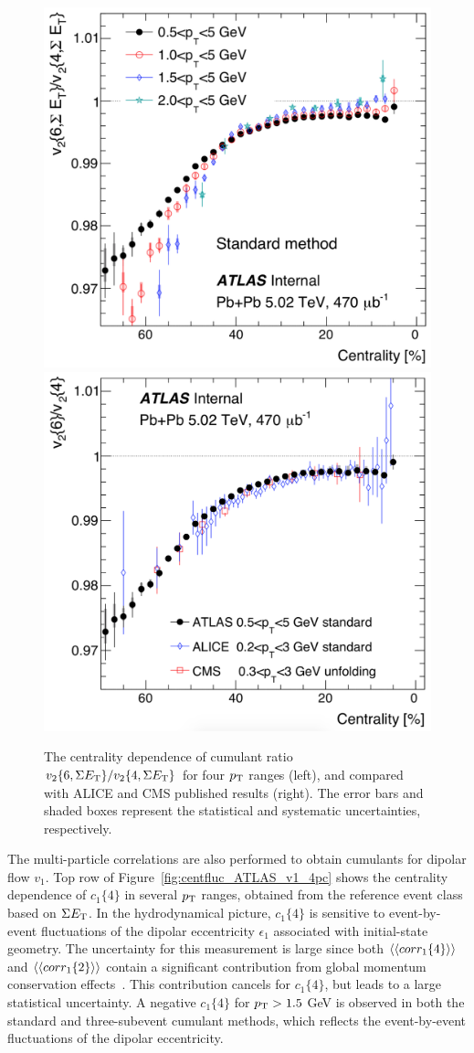 \begin{figure}[H]
\centering
\includegraphics[width=.475\linewidth]{figs/chapter_centfluc/ATLAS_v2_64pc_ratio.png}
\includegraphics[width=.475\linewidth]{figs/chapter_centfluc/ATLAS_v2_64pc_ratio_comp.png}
\caption{The centrality dependence of cumulant ratio $v_2\{6, \Sigma E_\text{T}\} / v_2\{4, \Sigma E_\text{T}\}$ for four $p_\text{T}$ ranges (left), and compared with ALICE and CMS published results (right). The error bars and shaded boxes represent the statistical and systematic uncertainties, respectively.}
\label{fig:centfluc_ATLAS_v2_64pc_ratio}
\end{figure}

The multi-particle correlations are also performed to obtain cumulants for dipolar flow $v_1$. Top row of Figure~\ref{fig:centfluc_ATLAS_v1_4pc} shows the centrality dependence of $c_1\{4\}$ in several $p_\text{T}$ ranges, obtained from the reference event class based on $\Sigma E_\text{T}$. In the hydrodynamical picture, $c_1\{4\}$ is sensitive to event-by-event fluctuations of the dipolar eccentricity $\epsilon_1$ associated with initial-state geometry. The uncertainty for this measurement is large since both $\left\langle \left\langle corr_1\{4\}\right\rangle\right\rangle$ and $\left\langle \left\langle corr_1\{2\}\right\rangle\right\rangle$ contain a significant contribution from global momentum conservation effects~\cite{ATLAS:2012at, Borghini:2002mv}. This contribution cancels for $c_1\{4\}$, but leads to a large statistical uncertainty. A negative $c_1\{4\}$ for $p_\text{T}>1.5$ GeV is observed in both the standard and three-subevent cumulant methods, which reflects the event-by-event fluctuations of the dipolar eccentricity.

